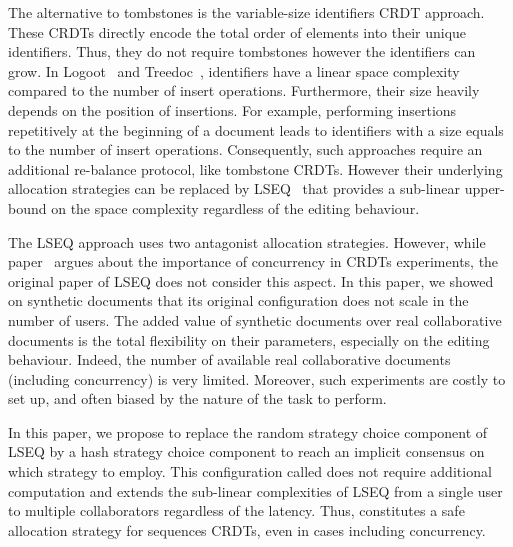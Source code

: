 The alternative to tombstones is the variable-size identifiers CRDT
approach. These CRDTs directly encode the total order of elements into their
unique identifiers. Thus, they do not require tombstones however the
identifiers can grow. In Logoot~\cite{weiss2009logoot} and
Treedoc~\cite{preguica2009commutative}, identifiers have a linear space
complexity compared to the number of insert operations. Furthermore, their size
heavily depends on the position of insertions. For example, performing
insertions repetitively at the beginning of a document leads to identifiers
with a size equals to the number of insert operations. Consequently, such
approaches require an additional re-balance protocol, like tombstone CRDTs.
However their underlying allocation strategies can be replaced by
LSEQ~\cite{nedelec2013lseq} that provides a sub-linear upper-bound on the space
complexity regardless of the editing behaviour.

The LSEQ approach uses two antagonist allocation strategies. However, while
paper~\cite{ahmed2011evaluating} argues about the importance of concurrency in
CRDTs experiments, the original paper of LSEQ does not consider this aspect. In
this paper, we showed on synthetic documents that its original configuration
does not scale in the number of users. The added value of synthetic documents
over real collaborative documents is the total flexibility on their parameters,
especially on the editing behaviour. Indeed, the number of available real
collaborative documents (including concurrency) is very limited. Moreover, such
experiments are costly to set up, and often biased by the nature of the task to
perform.


In this paper, we propose to replace the random strategy choice component of
LSEQ by a hash strategy choice component to reach an implicit consensus on
which strategy to employ. This configuration called \NAME{} does not require
additional computation and extends the sub-linear complexities of LSEQ from a
single user to multiple collaborators regardless of the latency. Thus, \NAME{}
constitutes a safe allocation strategy for sequences CRDTs, even in cases
including concurrency.


